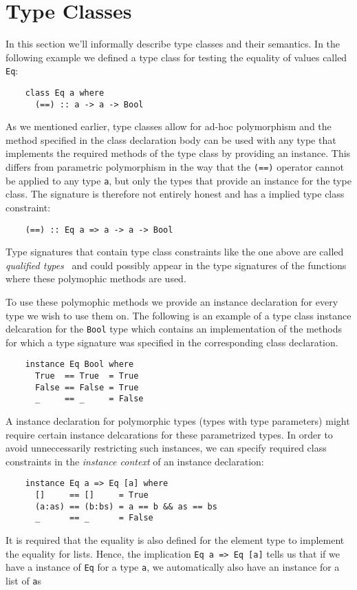 \section{Type Classes}
In this section we'll informally describe type classes and their semantics. In the
following example we defined a type class for testing the equality of values
called \texttt{Eq}:

\begin{verbatim}
    class Eq a where
      (==) :: a -> a -> Bool
\end{verbatim}

As we mentioned earlier, type classes allow for ad-hoc polymorphism and the method
specified in the class declaration body can be used with any type that
implements the required methods of the type class by providing an instance.
This differs from parametric polymorphism in the way that the \texttt{(==)}
operator cannot be applied to any type \texttt{a}, but only the types that provide an
instance for the type class. The signature is therefore not entirely honest and
has a implied type class constraint:
\begin{verbatim}
    (==) :: Eq a => a -> a -> Bool
\end{verbatim}
Type signatures that contain type class constraints like the one above are called
\textit{qualified types}~ and could possibly appear in the type signatures of the
functions where these polymophic methods are used.

To use these polymophic methods we provide an instance declaration for every type
we wish to use them on. The following is an example of a type class instance
delcaration for the \texttt{Bool} type which contains an implementation of the
methods for which a type signature was specified in the corresponding class
declaration.
\begin{verbatim}
    instance Eq Bool where
      True  == True  = True
      False == False = True
      _     == _     = False
\end{verbatim}

A instance declaration for polymorphic types (types with type parameters) might
require certain instance delcarations for these parametrized types. In order to avoid unneccessarily restricting such instances,
we can specify required class constraints in the {\em instance context} of an instance declaration:
\begin{verbatim}
    instance Eq a => Eq [a] where
      []     == []     = True
      (a:as) == (b:bs) = a == b && as == bs
      _      == _      = False
\end{verbatim}
It is required that the equality is also defined for the element type to
implement the equality for lists. Hence, the implication \texttt{Eq a => Eq [a]}
tells us that if we have a instance of \texttt{Eq} for a type \texttt{a}, we
automatically also have an instance for a list of \texttt{a}s

